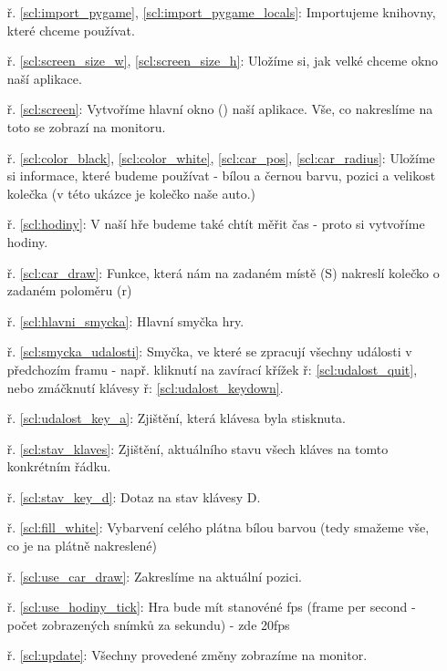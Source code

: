 \begin{minipage}[t]{.45\textwidth}
\begin{enumerate}
\item[ř. \ref{scl:import_pygame}, \ref{scl:import_pygame_locals}:] Importujeme knihovny, které chceme používat.
\item[ř. \ref{scl:screen_size_w}, \ref{scl:screen_size_h}:] Uložíme si, jak velké chceme okno naší aplikace.
\vspace{1.5cm}
\item[ř. \ref{scl:screen}:] Vytvoříme hlavní okno () naší aplikace. Vše, co nakreslíme na toto  se zobrazí na monitoru.
\item[ř. \ref{scl:color_black}, \ref{scl:color_white}, \ref{scl:car_pos}, \ref{scl:car_radius}:] Uložíme si informace, které budeme používat - bílou a černou barvu, pozici a velikost kolečka (v této ukázce je kolečko naše auto.)
\item[ř. \ref{scl:hodiny}:] V naší hře budeme také chtít měřit čas - proto si vytvoříme hodiny.
\vspace{1.8cm}
\item[ř. \ref{scl:car_draw}:] Funkce, která nám na zadaném místě (S) nakreslí kolečko o zadaném poloměru (r)
\vspace{1.5cm}
\item[ř. \ref{scl:hlavni_smycka}:] Hlavní smyčka hry.
\item[ř. \ref{scl:smycka_udalosti}:] Smyčka, ve které se zpracují všechny události v předchozím framu - např. kliknutí na zavírací křížek ř: \ref{scl:udalost_quit}, nebo zmáčknutí klávesy ř: \ref{scl:udalost_keydown}.
\item[ř. \ref{scl:udalost_key_a}:] Zjištění, která klávesa byla stisknuta.
\item[ř. \ref{scl:stav_klaves}:] Zjištění, aktuálního stavu všech kláves na tomto konkrétním řádku.
\item[ř. \ref{scl:stav_key_d}:] Dotaz na stav klávesy D.
\item[ř. \ref{scl:fill_white}:] Vybarvení celého plátna bílou barvou (tedy smažeme vše, co je na plátně nakreslené)
\item[ř. \ref{scl:use_car_draw}:] Zakreslíme  na aktuální pozici.
\item[ř. \ref{scl:use_hodiny_tick}:] Hra bude mít stanovéné fps (frame per second - počet zobrazených snímků za sekundu) - zde 20fps
\item[ř. \ref{scl:update}:] Všechny provedené změny zobrazíme na monitor.
\end{enumerate}
\end{minipage}

